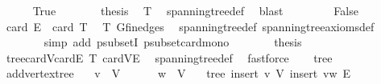 \begin{isabellebody}
\ \ \ \ \isamarkupfalse%
\ True\isanewline
\ \ \ \ \isamarkupfalse%
\ \isamarkupfalse%
\ {\isacharquery}{\kern0pt}thesis\ \isamarkupfalse%
\ T\ \isamarkupfalse%
\ spanning{\isacharunderscore}{\kern0pt}tree{\isacharunderscore}{\kern0pt}def\ \isamarkupfalse%
\ blast\isanewline
\ \ \isamarkupfalse%
\isanewline
\ \ \ \ \isamarkupfalse%
\ False\isanewline
\ \ \ \ \isamarkupfalse%
\ \isamarkupfalse%
\ {\isachardoublequoteopen}card\ E\ {\isachargreater}{\kern0pt}\ card\ T{\isachardoublequoteclose}\ \isamarkupfalse%
\ T\ G{\isachardot}{\kern0pt}fin{\isacharunderscore}{\kern0pt}edges\ \isamarkupfalse%
\ spanning{\isacharunderscore}{\kern0pt}tree{\isacharunderscore}{\kern0pt}def\ spanning{\isacharunderscore}{\kern0pt}tree{\isacharunderscore}{\kern0pt}axioms{\isacharunderscore}{\kern0pt}def\isanewline
\ \ \ \ \ \ \isamarkupfalse%
\ {\isacharparenleft}{\kern0pt}simp\ add{\isacharcolon}{\kern0pt}\ psubsetI\ psubset{\isacharunderscore}{\kern0pt}card{\isacharunderscore}{\kern0pt}mono{\isacharparenright}{\kern0pt}\isanewline
\ \ \ \ \isamarkupfalse%
\ \isamarkupfalse%
\ {\isacharquery}{\kern0pt}thesis\ \isamarkupfalse%
\ tree{\isachardot}{\kern0pt}card{\isacharunderscore}{\kern0pt}V{\isacharunderscore}{\kern0pt}card{\isacharunderscore}{\kern0pt}E\ T\ card{\isacharunderscore}{\kern0pt}V{\isacharunderscore}{\kern0pt}E\ \isamarkupfalse%
\ spanning{\isacharunderscore}{\kern0pt}tree{\isacharunderscore}{\kern0pt}def\ \isamarkupfalse%
\ fastforce\isanewline
\ \ \isamarkupfalse%
\isanewline
{}\isamarkupfalse%
%
\endisatagproof
{\isafoldproof}%
%
\isadelimproof
\isanewline
%
\endisadelimproof
\isanewline
{}\isamarkupfalse%
\ tree\isanewline
{}\isanewline
\isanewline
{}\isamarkupfalse%
\ add{\isacharunderscore}{\kern0pt}vertex{\isacharunderscore}{\kern0pt}tree{\isacharcolon}{\kern0pt}\isanewline
\ \ \ {\isachardoublequoteopen}v\ {\isasymnotin}\ V{\isachardoublequoteclose}\isanewline
\ \ \ \ \ \ {\isachardoublequoteopen}w\ {\isasymin}\ V{\isachardoublequoteclose}\isanewline
\ \ \ {\isachardoublequoteopen}tree\ {\isacharparenleft}{\kern0pt}insert\ v\ V{\isacharparenright}{\kern0pt}\ {\isacharparenleft}{\kern0pt}insert\ {\isacharbraceleft}{\kern0pt}v{\isacharcomma}{\kern0pt}w{\isacharbraceright}{\kern0pt}\ E{\isacharparenright}{\kern0pt}{\isachardoublequoteclose}\isanewline

\end{isabellebody}
